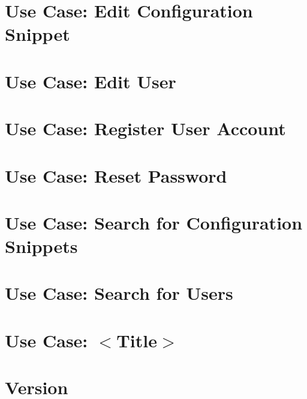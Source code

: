 \let\mypdfximage\pdfximage\def\pdfximage{\immediate\mypdfximage}\documentclass[twoside]{book}
\newcommand{\+}{\discretionary{\mbox{\scriptsize$\hookleftarrow$}}{}{}}
\begin{document}
\chapter{Use Case\+: Edit Configuration Snippet}
\label{doc_usecases_snippet_sharing_UC_edit_snippet_md}

\chapter{Use Case\+: Edit User}
\label{doc_usecases_snippet_sharing_UC_edit_user_md}

\chapter{Use Case\+: Register User Account}
\label{doc_usecases_snippet_sharing_UC_register_md}

\chapter{Use Case\+: Reset Password}
\label{doc_usecases_snippet_sharing_UC_reset_password_md}

\chapter{Use Case\+: Search for Configuration Snippets}
\label{doc_usecases_snippet_sharing_UC_search_snippet_md}

\chapter{Use Case\+: Search for Users}
\label{doc_usecases_snippet_sharing_UC_search_user_md}

\chapter{Use Case\+: $<$Title$>$}
\label{doc_usecases_template_md}

\chapter{Version}
\label{doc_VERSION_md}

\end{document}
